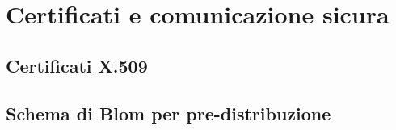 
\chapter{Certificati e comunicazione sicura}

    \bigskip
    \section{Certificati X.509}

    \bigskip
    \section{Schema di Blom per pre-distribuzione}




